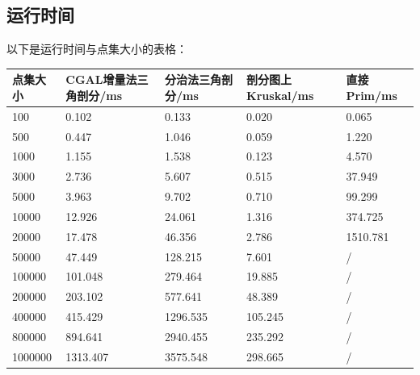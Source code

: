 \documentclass[a4paper]{article}
\begin{document}
\subsection{运行时间}
以下是运行时间与点集大小的表格：
\begin{center}
\begin{tabular}{lp{2.1cm}p{2cm}p{1.8cm}p{2.25cm}}
\hline
    点集大小 & CGAL增量法三角剖分/ms & 分治法三角剖分/ms & 剖分图上Kruskal/ms & 直接Prim/ms \\\hline
     100 &          0.102 &      0.133 &          0.020 &     0.065 \\
     500 &          0.447 &      1.046 &          0.059 &     1.220 \\
    1000 &          1.155 &      1.538 &          0.123 &     4.570 \\
    3000 &          2.736 &      5.607 &          0.515 &    37.949 \\
    5000 &          3.963 &      9.702 &          0.710 &    99.299 \\
   10000 &         12.926 &     24.061 &          1.316 &   374.725 \\
   20000 &         17.478 &     46.356 &          2.786 &  1510.781 \\
   50000 &         47.449 &    128.215 &          7.601 &         / \\
  100000 &        101.048 &    279.464 &         19.885 &         / \\
  200000 &        203.102 &    577.641 &         48.389 &         / \\
  400000 &        415.429 &   1296.535 &        105.245 &         / \\
  800000 &        894.641 &   2940.455 &        235.292 &         / \\
 1000000 &       1313.407 &   3575.548 &        298.665 &         / \\
\hline
\end{tabular}
\end{center}
\end{document}

